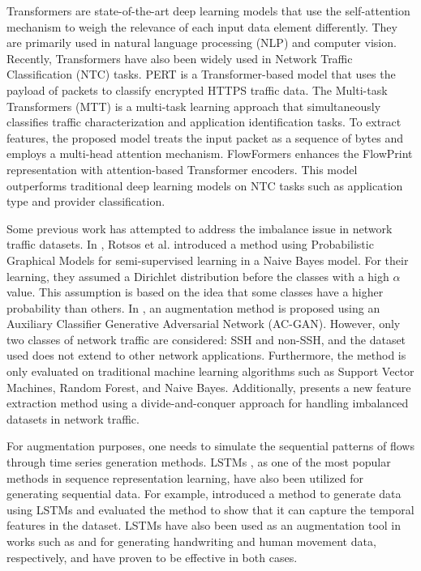 Transformers \cite{vaswani2017attention} are state-of-the-art deep learning models that use the self-attention mechanism to weigh the relevance of each input data element differently. They are primarily used in natural language processing (NLP) and computer vision. Recently, Transformers have also been widely used in Network Traffic Classification (NTC) tasks. PERT \cite{he2020pert} is a Transformer-based model that uses the payload of packets to classify encrypted HTTPS traffic data. The Multi-task Transformers (MTT) \cite{zheng2022mtt} is a multi-task learning approach that simultaneously classifies traffic characterization and application identification tasks. To extract features, the proposed model treats the input packet as a sequence of bytes and employs a multi-head attention mechanism. FlowFormers \cite{FlowFormers} enhances the FlowPrint representation with attention-based Transformer encoders. This model outperforms traditional deep learning models on NTC tasks such as application type and provider classification.

Some previous work has attempted to address the imbalance issue in network traffic datasets. In \cite{PGMMOORE}, Rotsos et al. introduced a method using Probabilistic Graphical Models for semi-supervised learning in a Naive Bayes model. For their learning, they assumed a Dirichlet distribution before the classes with a high $\alpha$ value. This assumption is based on the idea that some classes have a higher probability than others. In \cite{acganaug}, an augmentation method is proposed using an Auxiliary Classifier Generative Adversarial Network (AC-GAN). However, only two classes of network traffic are considered: SSH and non-SSH, and the dataset used does not extend to other network applications. Furthermore, the method is only evaluated on traditional machine learning algorithms such as Support Vector Machines, Random Forest, and Naive Bayes. Additionally, \cite{devide&conqueraug} presents a new feature extraction method using a divide-and-conquer approach for handling imbalanced datasets in network traffic.

For augmentation purposes, one needs to simulate the sequential patterns of flows through time series generation methods. LSTMs \cite{LSTM}, as one of the most popular methods in sequence representation learning, have also been utilized for generating sequential data. For example, \cite{LSTMGEN} introduced a method to generate data using LSTMs and evaluated the method to show that it can capture the temporal features in the dataset. LSTMs have also been used as an augmentation tool in works such as \cite{daskhataug} and \cite{LSTM_ae_aug} for generating handwriting and human movement data, respectively, and have proven to be effective in both cases.


